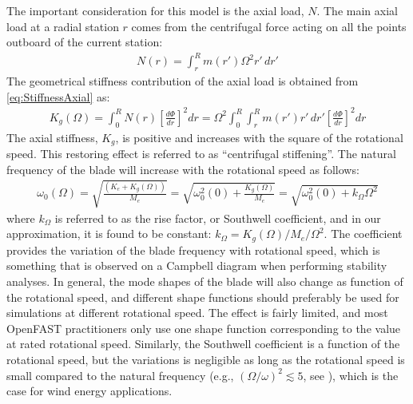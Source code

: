 \documentclass[wes, manuscript]{copernicus}
\begin{document}
The important consideration for this model is the axial load, $N$.
The main axial load at a radial station $r$ comes from the centrifugal force acting on all the points outboard of the current station:
\begin{align}
    N(r)=\int_r^R m(r') \Omega^2  r' \, dr'
\end{align}
The geometrical stiffness contribution of the axial load is obtained from \autoref{eq:StiffnessAxial} as:
\begin{align}
    K_g(\Omega) = \int_0^R N(r) \left[\frac{d\Phi}{dr} \right]^2  dr  
    = \Omega^2 \int_0^R \int_r^R m(r') r' \, dr'
 \left[\frac{d\Phi}{dr} \right]^2 dr  
 \label{eq:GeomStiffCentri}
\end{align}
% 
The axial stiffness, $K_g$, is positive and increases with the square of the rotational speed. 
This restoring effect is referred to as ``centrifugal stiffening''.
The natural frequency of the blade will increase with the rotational speed as follows:
\begin{align}
   \omega_0(\Omega)=\sqrt{\frac{(K_{e}+ K_g(\Omega))}{M_e}} 
   = \sqrt{ \omega_0^2(0) + \frac{K_g(\Omega)}{M_e} } 
   = \sqrt{ \omega_0^2(0) +  k_\Omega \Omega^2 } 
\end{align}
where $k_\Omega$ is referred to as the rise factor, or Southwell coefficient, and in our approximation, it is found to be constant: $k_\Omega=K_g(\Omega)/M_e/\Omega^2$.
The coefficient provides the variation of the blade frequency with rotational speed, which is something that is observed on a Campbell diagram when performing stability analyses.
In general, the mode shapes of the blade will also change as function of the rotational speed, and different shape functions should preferably be used for simulations at different rotational speed. The effect is fairly limited, and most OpenFAST practitioners only use one shape function corresponding to the value at rated rotational speed.
Similarly, the Southwell coefficient is a function of the rotational speed, but the variations is negligible as long as the rotational speed is small compared to the natural frequency (e.g., $(\Omega/\omega)^2 \lesssim 5$, see \cite{bielawa:2006:book}), which is the case for wind energy applications.
\end{document}
